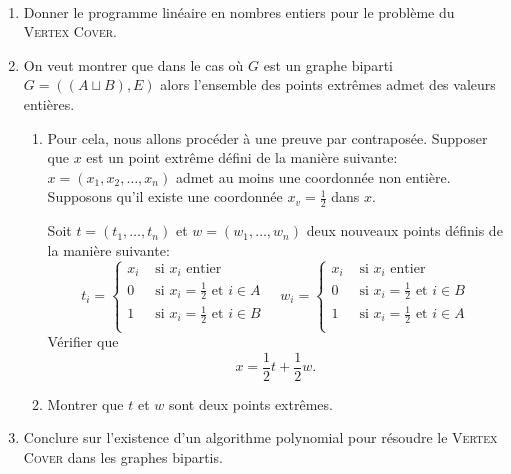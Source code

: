 \begin{td-exo}\, %
	\begin{enumerate}
		\item Donner le programme linéaire en nombres entiers pour le problème du \textsc{Vertex Cover}.

		\item On veut montrer que dans le cas où \(G\) est un graphe biparti \(G = ((A \sqcup B), E)\) alors l'ensemble des points extrêmes admet des valeurs entières.

		\begin{enumerate}
			\item Pour cela, nous allons procéder à une preuve par contraposée.
			Supposer que \(x\) est un point extrême défini de la manière suivante: \(x = \left(x_1,x_2,\ldots,x_n\right)\) admet au moins une coordonnée non entière.
			Supposons qu'il existe une coordonnée \(x_v = \frac{1}{2}\) dans \(x\).

			Soit \(t = (t_1,\ldots,t_n)\) et \(w = (w_1,\ldots,w_n)\) deux nouveaux points définis de la manière suivante:
			\begin{equation*}
				t_i = 
				\begin{cases}
					x_i &\text{ si } x_i \text{ entier}\\
					0  &\text{ si } x_i =\frac{1}{2} \text{ et } i \in A\\
					1  &\text{ si } x_i =\frac{1}{2} \text{ et } i \in B\\
				\end{cases}
				\quad
				w_i = 
				\begin{cases}
					x_i &\text{ si } x_i \text{ entier}\\
					0  &\text{ si } x_i =\frac{1}{2} \text{ et } i \in B\\
					1  &\text{ si } x_i =\frac{1}{2} \text{ et } i \in A\\
				\end{cases}
			\end{equation*}
			Vérifier que
			\begin{equation*}
				x = \frac{1}{2} t + \frac{1}{2} w.
			\end{equation*}

			\item Montrer que \(t\) et \(w\) sont deux points extrêmes.
		\end{enumerate}

		\item Conclure sur l'existence d'un algorithme polynomial pour résoudre le \textsc{Vertex Cover} dans les graphes bipartis.
	\end{enumerate}
\end{td-exo}

